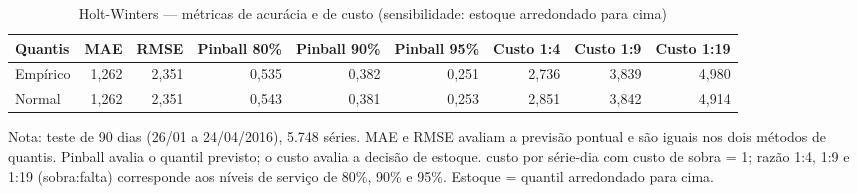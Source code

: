 \begin{table}[htbp]
\centering
\small
\caption{Holt-Winters — métricas de acurácia e de custo (sensibilidade: estoque arredondado para cima)}
\label{tab:hw_metricas_sensibilidade}
\begin{tabular}{lrrrrrrrr}
\toprule
Quantis & MAE & RMSE & Pinball 80\% & Pinball 90\% & Pinball 95\% & Custo 1:4 & Custo 1:9 & Custo 1:19 \\
\midrule
Empírico & 1,262 & 2,351 & 0,535 & 0,382 & 0,251 & 2,736 & 3,839 & 4,980 \\
Normal & 1,262 & 2,351 & 0,543 & 0,381 & 0,253 & 2,851 & 3,842 & 4,914 \\
\bottomrule
\end{tabular}
\par\smallskip
{\footnotesize Nota: teste de 90 dias (26/01 a 24/04/2016), 5.748 séries. MAE e RMSE avaliam a previsão pontual e são iguais nos dois métodos de quantis. Pinball avalia o quantil previsto; o custo avalia a decisão de estoque. custo por série-dia com custo de sobra = 1; razão 1:4, 1:9 e 1:19 (sobra:falta) corresponde aos níveis de serviço de 80\%, 90\% e 95\%. Estoque = quantil arredondado para cima.}
\end{table}
